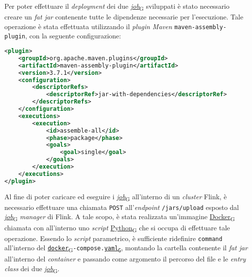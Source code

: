Per poter effettuare il \textit{deployment} dei due \href{https://7last.github.io/docs/pb/documentazione-interna/glossario\#job}{\textit{job}\textsubscript{G}} sviluppati è stato necessario creare un \textit{fat jar} contenente tutte le dipendenze necessarie per l'esecuzione.
Tale operazione è stata effettuata utilizzando il \textit{plugin Maven} \texttt{maven-assembly-plugin}, con la seguente configurazione:

\begin{lstlisting}[language=XML, caption=Configurazione del \textit{plugin} \texttt{maven-assembly-plugin} per la creazione del \textit{fat jar},captionpos=b]
<plugin>
    <groupId>org.apache.maven.plugins</groupId>
    <artifactId>maven-assembly-plugin</artifactId>
    <version>3.7.1</version>
    <configuration>
        <descriptorRefs>
            <descriptorRef>jar-with-dependencies</descriptorRef>
        </descriptorRefs>
    </configuration>
    <executions>
        <execution>
            <id>assemble-all</id>
            <phase>package</phase>
            <goals>
                <goal>single</goal>
            </goals>
        </execution>
    </executions>
</plugin>
\end{lstlisting}
Al fine di poter caricare ed eseguire i \href{https://7last.github.io/docs/pb/documentazione-interna/glossario\#job}{\textit{job}\textsubscript{G}} all'interno di un \textit{cluster} Flink, è necessario effettuare una chiamata \texttt{POST} all'\textit{endpoint} \texttt{/jars/upload}
esposto dal \href{https://7last.github.io/docs/pb/documentazione-interna/glossario\#job}{\textit{job}\textsubscript{G}}\textit{ manager} di Flink. A tale scopo, è stata realizzata un'immagine \href{https://7last.github.io/docs/pb/documentazione-interna/glossario\#docker}{Docker\textsubscript{G}} chiamata \texttt{} con all'interno uno \textit{script}
\href{https://7last.github.io/docs/pb/documentazione-interna/glossario\#python}{Python\textsubscript{G}} che si occupa di effettuare tale operazione. Essendo lo \textit{script} parametrico, è sufficiente ridefinire \texttt{command} all'interno del \href{https://7last.github.io/docs/pb/documentazione-interna/glossario\#docker}{\texttt{docker}\textsubscript{G}}\texttt{-compose.\href{https://7last.github.io/docs/pb/documentazione-interna/glossario\#yet-another-markup-language}{yaml\textsubscript{G}}},
montando la cartella contenente il \textit{fat jar} all'interno del \textit{container} e passando come argomento il percorso del file e le \textit{entry class} dei due \href{https://7last.github.io/docs/pb/documentazione-interna/glossario\#job}{\textit{job}\textsubscript{G}}.

